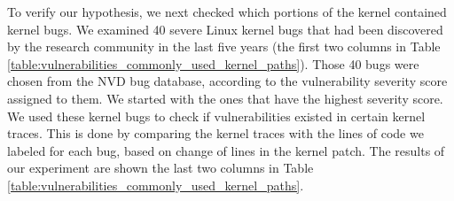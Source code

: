 To verify our hypothesis, we next checked which portions of
the kernel contained kernel bugs. We examined 40 severe Linux kernel
bugs that had been discovered by the research community in the last five
years (the first two columns in Table 
\ref{table:vulnerabilities_commonly_used_kernel_paths}). 
Those 40 bugs were chosen from the NVD bug database, according to 
the vulnerability severity score assigned to them. We started with the ones 
that have the highest severity score. 
We used these kernel bugs to check if vulnerabilities existed in certain
kernel traces. This is done by comparing the kernel traces with the lines 
of code we labeled for each bug, based on change of lines in the 
kernel patch.   
The results of our experiment are shown the last two columns in Table
\ref{table:vulnerabilities_commonly_used_kernel_paths}.

